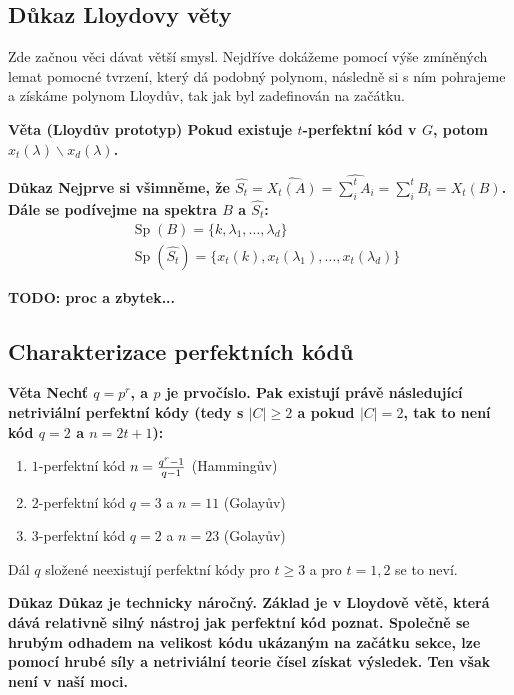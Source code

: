 \documentclass[a4paper,12pt,titlepage]{article}
\newcommand{\dk}{\smallskip\noindent\bf Důkaz\rm{} }
\newcommand{\vt}{\smallskip\noindent\bf Věta\rm{} }
\newcommand{\todo}[1]{\bf TODO: \rm#1}
\DeclareMathOperator{\Sp}{Sp}
\begin{document}
\subsection{Důkaz Lloydovy věty}

Zde začnou věci dávat větší smysl. Nejdříve dokážeme pomocí výše zmíněných lemat pomocné tvrzení, který dá podobný polynom, následně si s ním pohrajeme a získáme polynom Lloydův, tak jak byl zadefinován na začátku.

\vt (Lloydův prototyp) Pokud existuje $t$-perfektní kód v $G$, potom $x_t(\lambda)\backslash x_d(\lambda)$.

\dk Nejprve si všimněme, že $\widehat{S_t} = \widehat{X_t(A)} = \widehat{\sum_i^t A_i} = \sum_i^t B_i = X_t(B)$.
Dále se podívejme na spektra $B$ a $\widehat{S_t}$:
\begin{align}
	&\Sp(B) = \{ k, \lambda_1, \ldots, \lambda_d \} \\
	&\Sp(\widehat{S_t}) = \{ x_t(k), x_t(\lambda_1), \ldots, x_t(\lambda_d) \}
\end{align}

\todo{proc a zbytek...}


\subsection{Charakterizace perfektních kódů}

\vt Nechť $q=p^r$, a $p$ je prvočíslo. Pak existují právě následující netriviální perfektní kódy (tedy s $|C| \geq 2$ a pokud $|C| = 2$, tak to není kód $q=2$ a $n=2t+1$):
\begin{enumerate}
	\item $1$-perfektní kód $n={q^r-1 \over q-1}$ (Hammingův)
	\item $2$-perfektní kód $q=3$ a $n=11$ (Golayův)
	\item $3$-perfektní kód $q=2$ a $n=23$ (Golayův)
\end{enumerate}
Dál $q$ složené neexistují perfektní kódy pro $t \geq 3$ a pro $t = 1,2$ se to neví.

\dk Důkaz je technicky náročný. Základ je v Lloydově větě, která dává relativně silný nástroj jak perfektní kód poznat. Společně se hrubým odhadem na velikost kódu ukázaným na začátku sekce, lze pomocí hrubé síly a netriviální teorie čísel získat výsledek. Ten však není v naší moci.
\end{document}

